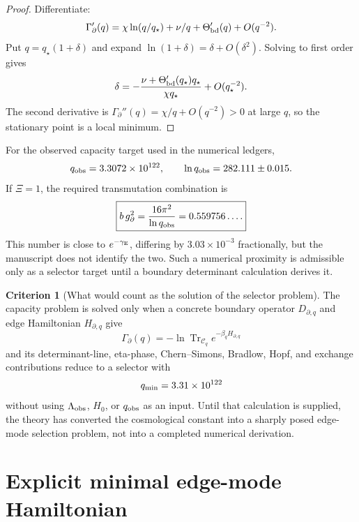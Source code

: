 \documentclass[aps,prd,reprint,nofootinbib,superscriptaddress,floatfix]{revtex4-2}
\numberwithin{equation}{section}
\theoremstyle{definition}
\newtheorem{criterion}{Criterion}[section]
\theoremstyle{plain}
\begin{document}
\begin{proof}
Differentiate:
\[
\Gamma_\partial'(q)
=
\chi\ln(q/q_\star)+\nu/q+\Theta'_{\rm bd}(q)+O(q^{-2}).
\]
Put \(q=q_\star(1+\delta)\) and expand
\(\ln(1+\delta)=\delta+O(\delta^2)\).  Solving to first order gives
\[
\delta=
-\frac{\nu+\Theta'_{\rm bd}(q_\star)q_\star}{\chi q_\star}
+O(q_\star^{-2}).
\]
The second derivative is \(\Gamma_\partial''(q)=\chi/q+O(q^{-2})>0\) at
large \(q\), so the stationary point is a local minimum.
\end{proof}

For the observed capacity target used in the numerical ledgers,
\begin{equation}
q_{\rm obs}=3.3072\times10^{122},
\qquad
\ln q_{\rm obs}=282.111\pm0.015 .
\end{equation}
If \(\Xi=1\), the required transmutation combination is
\begin{equation}
\boxed{
b\,g_\partial^2
=
\frac{16\pi^2}{\ln q_{\rm obs}}
=
0.559756\ldots .
}
\end{equation}
This number is close to \(e^{-\gamma_{\rm E}}\), differing by
\(3.03\times10^{-3}\) fractionally, but the manuscript does not identify
the two.  Such a numerical proximity is admissible only as a selector
target until a boundary determinant calculation derives it.

\begin{criterion}[What would count as the solution of the selector problem]
The capacity problem is solved only when a concrete boundary operator
\(D_{\partial,q}\) and edge Hamiltonian \(H_{\partial,q}\) give
\begin{equation}
\Gamma_\partial(q)
=
-\ln\operatorname{Tr}_{\mathcal C_q}e^{-\beta_qH_{\partial,q}}
\end{equation}
and its determinant-line, eta-phase, Chern--Simons, Bradlow, Hopf, and
exchange contributions reduce to a selector with
\begin{equation}
q_{\rm min}=3.31\times10^{122}
\end{equation}
without using \(\Lambda_{\rm obs}\), \(H_0\), or \(q_{\rm obs}\) as an
input.  Until that calculation is supplied, the theory has converted the
cosmological constant into a sharply posed edge-mode selection problem,
not into a completed numerical derivation.
\end{criterion}




\section{Explicit minimal edge-mode Hamiltonian}
\label{sec:explicit-edge-mode-hamiltonian}
\end{document}
